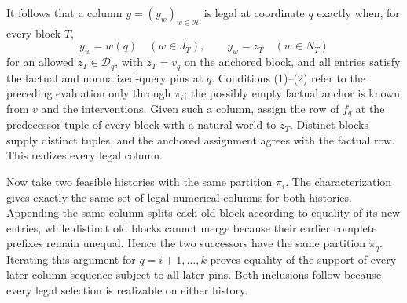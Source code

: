 It follows that a column \(y=(y_w)_{w\in\mathcal H}\) is legal at coordinate \(q\) exactly when, for every block \(T\),
\[
 y_w=w(q)\quad(w\in J_T),
 \qquad
 y_w=z_T\quad(w\in N_T)
 \tag{2}
\]
for an allowed \(z_T\in\mathcal D_q\), with \(z_T=v_q\) on the anchored block, and all entries satisfy the factual and normalized-query pins at \(q\). Conditions (1)--(2) refer to the preceding evaluation only through \(\pi_i\); the possibly empty factual anchor is known from \(v\) and the interventions. Given such a column, assign the row of \(f_q\) at the predecessor tuple of every block with a natural world to \(z_T\). Distinct blocks supply distinct tuples, and the anchored assignment agrees with the factual row. This realizes every legal column.

Now take two feasible histories with the same partition \(\pi_i\). The characterization gives exactly the same set of legal numerical columns for both histories. Appending the same column splits each old block according to equality of its new entries, while distinct old blocks cannot merge because their earlier complete prefixes remain unequal. Hence the two successors have the same partition \(\pi_q\). Iterating this argument for \(q=i+1,\ldots,k\) proves equality of the support of every later column sequence subject to all later pins. Both inclusions follow because every legal selection is realizable on either history.


